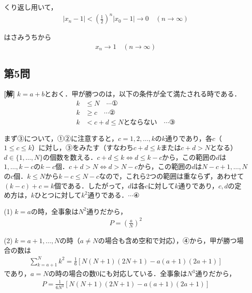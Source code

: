 \documentclass[../main.tex]{subfiles}
\begin{document}
くり返し用いて，
\begin{align*}
  |x_n-1|<\left(\frac12\right)^n|x_0-1|\longrightarrow0\quad(n\to\infty)
\end{align*}

はさみうちから
\begin{align*}
  x_n\longrightarrow1\quad(n\to\infty)
\end{align*}

\bigskip

\subsection*{第5問}

\noindent
{\bf [解]}
$k=a+b$とおく．甲が勝つのは，以下の条件が全て満たされる時である．
\begin{align*}
  k&\le N\quad\cdots①\\
  k&\ge c\quad\cdots②\\
  k&<c+d\le N\text{とならない}\quad\cdots③
\end{align*}

まず③について，①②に注意すると，$c=1,2,\ldots,k$の$k$通りであり，各$c$（$1\le c\le k$）に対し，③をみたす（すなわち$c+d\le k$または$c+d>N$となる）$d\in\{1,\ldots,N\}$の個数を数える．$c+d\le k\iff d\le k-c$から，この範囲の$d$は$1,\ldots,k-c$の$k-c$個．$c+d>N\iff d>N-c$から，この範囲の$d$は$N-c+1,\ldots,N$の$c$個．$k\le N$から$k-c\le N-c$なので，これら2つの範囲は重ならず，あわせて$(k-c)+c=k$個である．したがって，$d$は各$c$に対して$k$通りであり，$c,d$の定め方は，$k$ひとつに対して$k^2$通りである．$\cdots④$

(1) $k=a$の時，全事象は$N^2$通りだから，
\begin{align*}
  P=\left(\frac aN\right)^2
\end{align*}

(2) $k=a+1,\ldots,N$の時（$a\ne N$の場合も含め空和で対応），④から，甲が勝つ場合の数は
\begin{align*}
  \sum_{k=a+1}^Nk^2=\frac16\left[N(N+1)(2N+1)-a(a+1)(2a+1)\right]
\end{align*}
であり，$a=N$の時の場合の数$0$にも対応している．全事象は$N^3$通りだから，
\begin{align*}
  P=\frac1{6N^3}\left[N(N+1)(2N+1)-a(a+1)(2a+1)\right]
\end{align*}
\end{document}
